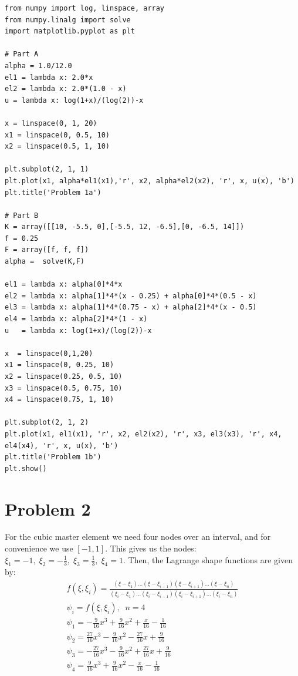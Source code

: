 \documentclass[10pt]{article}
\begin{document}
\begin{lstlisting}
from numpy import log, linspace, array
from numpy.linalg import solve
import matplotlib.pyplot as plt

# Part A
alpha = 1.0/12.0
el1 = lambda x: 2.0*x
el2 = lambda x: 2.0*(1.0 - x)
u = lambda x: log(1+x)/(log(2))-x

x = linspace(0, 1, 20)
x1 = linspace(0, 0.5, 10)
x2 = linspace(0.5, 1, 10)

plt.subplot(2, 1, 1)
plt.plot(x1, alpha*el1(x1),'r', x2, alpha*el2(x2), 'r', x, u(x), 'b')
plt.title('Problem 1a')

# Part B
K = array([[10, -5.5, 0],[-5.5, 12, -6.5],[0, -6.5, 14]])
f = 0.25
F = array([f, f, f])
alpha =  solve(K,F)

el1 = lambda x: alpha[0]*4*x
el2 = lambda x: alpha[1]*4*(x - 0.25) + alpha[0]*4*(0.5 - x)
el3 = lambda x: alpha[1]*4*(0.75 - x) + alpha[2]*4*(x - 0.5)
el4 = lambda x: alpha[2]*4*(1 - x)
u   = lambda x: log(1+x)/(log(2))-x

x  = linspace(0,1,20)
x1 = linspace(0, 0.25, 10)
x2 = linspace(0.25, 0.5, 10)
x3 = linspace(0.5, 0.75, 10)
x4 = linspace(0.75, 1, 10)

plt.subplot(2, 1, 2)
plt.plot(x1, el1(x1), 'r', x2, el2(x2), 'r', x3, el3(x3), 'r', x4, el4(x4), 'r', x, u(x), 'b')
plt.title('Problem 1b')
plt.show()
\end{lstlisting}
\section*{Problem 2}
For the cubic master element we need four nodes over an interval, and for convenience we use $[-1, 1]$. This gives us the nodes: $\xi_1 = -1,\; \xi_2= -\frac13,\;\xi_3=\frac13,\;\xi_4=1.$
Then, the Lagrange shape functions are given by:
\begin{gather*}
f(\xi, \xi_i) = \frac{(\xi - \xi_1)...(\xi-\xi_{i-1})(\xi - \xi_{i+1})...(\xi - \xi_n)}{(\xi_i - \xi_1)...(\xi_i-\xi_{i-1})(\xi_i - \xi_{i+1})...(\xi_i - \xi_n)}\\
\psi_i = f(\xi, \xi_i), \;\; n = 4 \\
\psi_1 = -\frac{9}{16}x^3+\frac{9}{16}x^2 + \frac x{16} - \frac1{16}\\
\psi_2 = \frac{27}{16}x^3 - \frac{9}{16}x^2-\frac{27}{16}x+\frac9{16}\\
\psi_3 = -\frac{27}{16}x^3-\frac9{16}x^2+\frac{27}{16}x+\frac9{16}\\
\psi_4 = \frac9{16}x^3+\frac9{16}x^2-\frac x{16}-\frac1{16}
\end{gather*}
\end{document}
